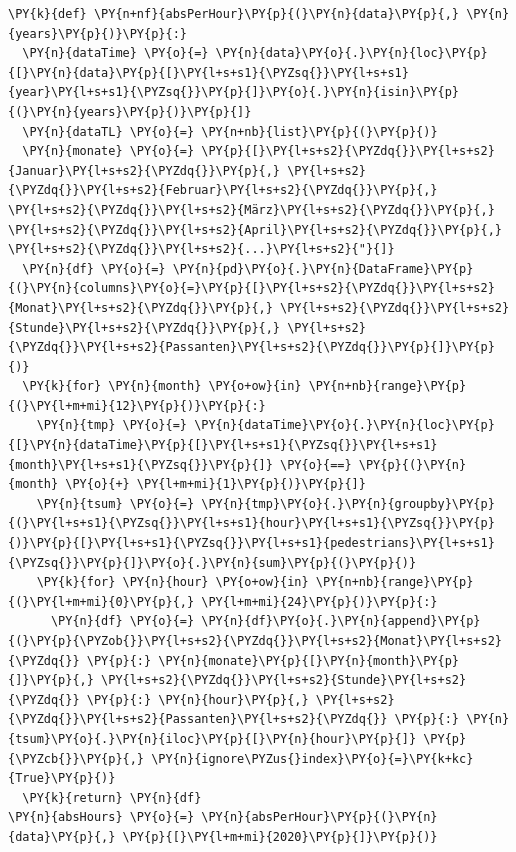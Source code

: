 \bigbreak
\begin{tcolorbox}[breakable, size=fbox, boxrule=1pt, pad at break*=1mm,colback=cellbackground, colframe=cellborder]
\begin{Verbatim}[commandchars=\\\{\}]
\PY{k}{def} \PY{n+nf}{absPerHour}\PY{p}{(}\PY{n}{data}\PY{p}{,} \PY{n}{years}\PY{p}{)}\PY{p}{:}
  \PY{n}{dataTime} \PY{o}{=} \PY{n}{data}\PY{o}{.}\PY{n}{loc}\PY{p}{[}\PY{n}{data}\PY{p}{[}\PY{l+s+s1}{\PYZsq{}}\PY{l+s+s1}{year}\PY{l+s+s1}{\PYZsq{}}\PY{p}{]}\PY{o}{.}\PY{n}{isin}\PY{p}{(}\PY{n}{years}\PY{p}{)}\PY{p}{]}
  \PY{n}{dataTL} \PY{o}{=} \PY{n+nb}{list}\PY{p}{(}\PY{p}{)}
  \PY{n}{monate} \PY{o}{=} \PY{p}{[}\PY{l+s+s2}{\PYZdq{}}\PY{l+s+s2}{Januar}\PY{l+s+s2}{\PYZdq{}}\PY{p}{,} \PY{l+s+s2}{\PYZdq{}}\PY{l+s+s2}{Februar}\PY{l+s+s2}{\PYZdq{}}\PY{p}{,} \PY{l+s+s2}{\PYZdq{}}\PY{l+s+s2}{März}\PY{l+s+s2}{\PYZdq{}}\PY{p}{,} \PY{l+s+s2}{\PYZdq{}}\PY{l+s+s2}{April}\PY{l+s+s2}{\PYZdq{}}\PY{p}{,} \PY{l+s+s2}{\PYZdq{}}\PY{l+s+s2}{...}\PY{l+s+s2}{"}{]}
  \PY{n}{df} \PY{o}{=} \PY{n}{pd}\PY{o}{.}\PY{n}{DataFrame}\PY{p}{(}\PY{n}{columns}\PY{o}{=}\PY{p}{[}\PY{l+s+s2}{\PYZdq{}}\PY{l+s+s2}{Monat}\PY{l+s+s2}{\PYZdq{}}\PY{p}{,} \PY{l+s+s2}{\PYZdq{}}\PY{l+s+s2}{Stunde}\PY{l+s+s2}{\PYZdq{}}\PY{p}{,} \PY{l+s+s2}{\PYZdq{}}\PY{l+s+s2}{Passanten}\PY{l+s+s2}{\PYZdq{}}\PY{p}{]}\PY{p}{)}
  \PY{k}{for} \PY{n}{month} \PY{o+ow}{in} \PY{n+nb}{range}\PY{p}{(}\PY{l+m+mi}{12}\PY{p}{)}\PY{p}{:}
    \PY{n}{tmp} \PY{o}{=} \PY{n}{dataTime}\PY{o}{.}\PY{n}{loc}\PY{p}{[}\PY{n}{dataTime}\PY{p}{[}\PY{l+s+s1}{\PYZsq{}}\PY{l+s+s1}{month}\PY{l+s+s1}{\PYZsq{}}\PY{p}{]} \PY{o}{==} \PY{p}{(}\PY{n}{month} \PY{o}{+} \PY{l+m+mi}{1}\PY{p}{)}\PY{p}{]}
    \PY{n}{tsum} \PY{o}{=} \PY{n}{tmp}\PY{o}{.}\PY{n}{groupby}\PY{p}{(}\PY{l+s+s1}{\PYZsq{}}\PY{l+s+s1}{hour}\PY{l+s+s1}{\PYZsq{}}\PY{p}{)}\PY{p}{[}\PY{l+s+s1}{\PYZsq{}}\PY{l+s+s1}{pedestrians}\PY{l+s+s1}{\PYZsq{}}\PY{p}{]}\PY{o}{.}\PY{n}{sum}\PY{p}{(}\PY{p}{)}
    \PY{k}{for} \PY{n}{hour} \PY{o+ow}{in} \PY{n+nb}{range}\PY{p}{(}\PY{l+m+mi}{0}\PY{p}{,} \PY{l+m+mi}{24}\PY{p}{)}\PY{p}{:}
      \PY{n}{df} \PY{o}{=} \PY{n}{df}\PY{o}{.}\PY{n}{append}\PY{p}{(}\PY{p}{\PYZob{}}\PY{l+s+s2}{\PYZdq{}}\PY{l+s+s2}{Monat}\PY{l+s+s2}{\PYZdq{}} \PY{p}{:} \PY{n}{monate}\PY{p}{[}\PY{n}{month}\PY{p}{]}\PY{p}{,} \PY{l+s+s2}{\PYZdq{}}\PY{l+s+s2}{Stunde}\PY{l+s+s2}{\PYZdq{}} \PY{p}{:} \PY{n}{hour}\PY{p}{,} \PY{l+s+s2}{\PYZdq{}}\PY{l+s+s2}{Passanten}\PY{l+s+s2}{\PYZdq{}} \PY{p}{:} \PY{n}{tsum}\PY{o}{.}\PY{n}{iloc}\PY{p}{[}\PY{n}{hour}\PY{p}{]} \PY{p}{\PYZcb{}}\PY{p}{,} \PY{n}{ignore\PYZus{}index}\PY{o}{=}\PY{k+kc}{True}\PY{p}{)}
  \PY{k}{return} \PY{n}{df}
\PY{n}{absHours} \PY{o}{=} \PY{n}{absPerHour}\PY{p}{(}\PY{n}{data}\PY{p}{,} \PY{p}{[}\PY{l+m+mi}{2020}\PY{p}{]}\PY{p}{)}
\end{Verbatim}
\end{tcolorbox}
\bigbreak

